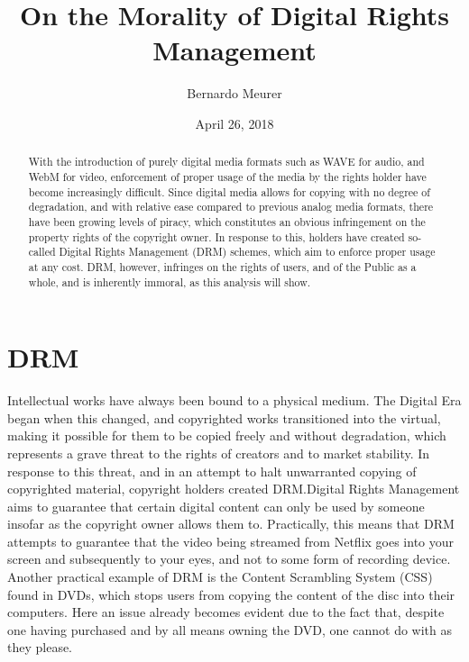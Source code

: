 \documentclass[12pt,letterpaper]{article}
\title{On the Morality of Digital Rights Management}
\author{Bernardo Meurer}
\date{April 26, 2018}
\begin{document}
\maketitle
\newpage
\begin{abstract}
	With the introduction of purely digital media formats such as WAVE for audio, and WebM for video, enforcement of proper usage of the media by the rights holder have become increasingly difficult.
	Since digital media allows for copying with no degree of degradation, and with relative ease compared to previous analog media formats, there have been growing levels of piracy, which constitutes an obvious infringement on the property rights of the copyright owner.
	In response to this, holders have created so-called Digital Rights Management (DRM) schemes, which aim to enforce proper usage at any cost. DRM, however, infringes on the rights of users, and of the Public as a whole, and is inherently immoral, as this analysis will show.
\end{abstract}
\onehalfspacing{}
\section{DRM}
Intellectual works have always been bound to a physical medium. The Digital Era began when this changed, and copyrighted works transitioned into the virtual, making it possible for them to be copied freely and without degradation, which represents a grave threat to the rights of creators and to market stability\autocite[\pno~117]{favale-2014}. In response to this threat, and in an attempt to halt unwarranted copying of copyrighted material, copyright holders created DRM.\@ Digital Rights Management aims to guarantee that certain digital content can only be used by someone insofar as the copyright owner allows them to. Practically, this means that DRM attempts to guarantee that the video being streamed from Netflix goes into your screen and subsequently to your eyes, and not to some form of recording device. Another practical example of DRM is the Content Scrambling System (CSS) found in DVDs, which stops users from copying the content of the disc into their computers. Here an issue already becomes evident due to the fact that, despite one having purchased and by all means owning the DVD, one cannot do with as they please.
\end{document}
